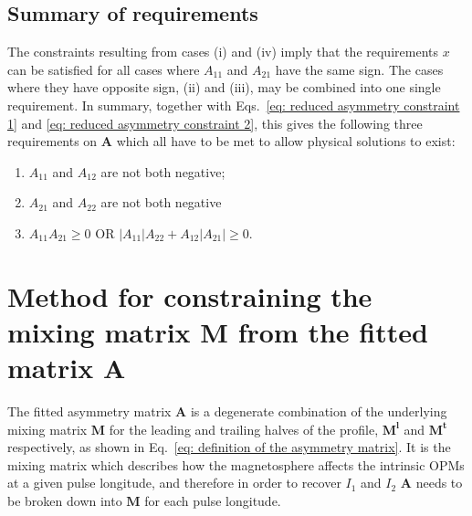 \subsection*{Summary of requirements}
The constraints resulting from cases (i) and (iv) imply that the requirements $x$ can be satisfied for all cases where $A_{11}$ and $A_{21}$ have the same sign. The cases where they have opposite sign, (ii) and (iii), may be combined into one single requirement. In summary, together with Eqs.~\eqref{eq: reduced asymmetry constraint 1} and \eqref{eq: reduced asymmetry constraint 2}, this gives the following three requirements on $\mathbf{A}$ which all have to be met to allow physical solutions to exist:
\begin{enumerate}
    \item $A_{11}$ and $A_{12}$ are not both negative;
    \item $A_{21}$ and $A_{22}$ are not both negative
    \item $A_{11}A_{21} \geq 0$ OR $|A_{11}|A_{22} + A_{12}|A_{21}| \geq 0$.
\end{enumerate}



\section{Method for constraining the mixing matrix \texorpdfstring{$\mathbf{M}$}{\textbf{M}} from the fitted matrix \texorpdfstring{$\mathbf{A}$}{\textbf{A}}}
\label{app: B0031temp - posmatrix explanation}

The fitted asymmetry matrix $\mathbf{A}$ is a degenerate combination of the underlying mixing matrix $\mathbf{M}$ for the leading and trailing halves of the profile, $\mathbf{M^l}$ and $\mathbf{M^t}$ respectively, as shown in Eq.~\eqref{eq: definition of the asymmetry matrix}. It is the mixing matrix which describes how the magnetosphere affects the intrinsic OPMs at a given pulse longitude, and therefore in order to recover $I_1$ and $I_2$ $\mathbf{A}$ needs to be broken down into $\mathbf{M}$ for each pulse longitude.

